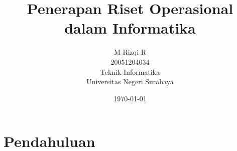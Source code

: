 \documentclass{article}
\title{\LARGE \textbf {\huge{Penerapan Riset Operasional dalam Informatika}}}
\author{
    M Rizqi R\\
    20051204034\\
    Teknik Informatika\\
    Universitas Negeri Surabaya\\
}
\date{\today}
\begin{document}
    \maketitle
    \section{Pendahuluan}
    
\end{document}
